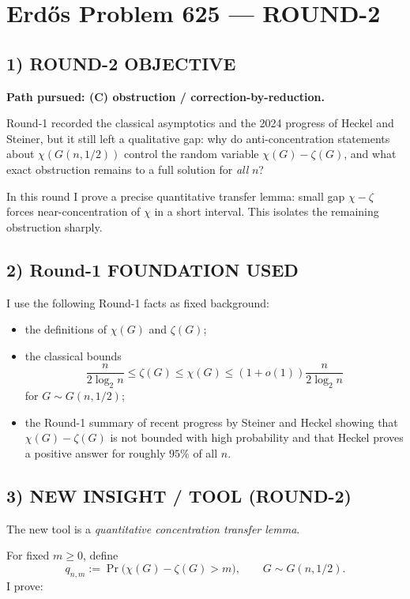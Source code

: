 \section{Erd\H{o}s Problem 625 --- ROUND-2}

\subsection*{1) ROUND-2 OBJECTIVE}

\textbf{Path pursued: (C) obstruction / correction-by-reduction.}

Round-1 recorded the classical asymptotics and the 2024 progress of Heckel and Steiner,
but it still left a qualitative gap:
why do anti-concentration statements about $\chi(G(n,1/2))$ control the random variable
$\chi(G)-\zeta(G)$, and what exact obstruction remains to a full solution for \emph{all} $n$?

In this round I prove a precise quantitative transfer lemma:
small gap $\chi-\zeta$ forces near-concentration of $\chi$ in a short interval.
This isolates the remaining obstruction sharply.

\subsection*{2) Round-1 FOUNDATION USED}

I use the following Round-1 facts as fixed background:

\begin{itemize}
\item the definitions of $\chi(G)$ and $\zeta(G)$;
\item the classical bounds
\[
\frac{n}{2\log_2 n}\le \zeta(G)\le \chi(G)\le (1+o(1))\frac{n}{2\log_2 n}
\]
for $G\sim G(n,1/2)$;
\item the Round-1 summary of recent progress by Steiner and Heckel showing that
$\chi(G)-\zeta(G)$ is not bounded with high probability and that Heckel proves a positive answer
for roughly $95\%$ of all $n$.
\end{itemize}

\subsection*{3) NEW INSIGHT / TOOL (ROUND-2)}

The new tool is a \emph{quantitative concentration transfer lemma}.

For fixed $m\ge 0$, define
\[
q_{n,m}:=\Pr\bigl(\chi(G)-\zeta(G)>m\bigr),
\qquad G\sim G(n,1/2).
\]
I prove:

